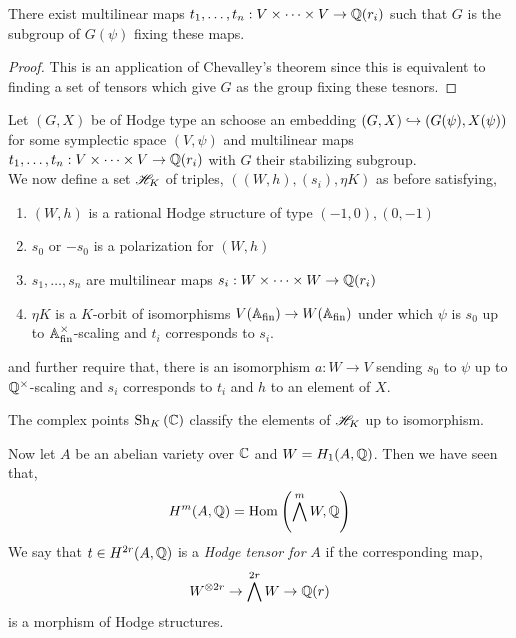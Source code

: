 \documentclass[12pt]{article}
\begin{document}
\begin{prop}
There exist multilinear maps $t_1, \dots, t_n : V \times \cdots \times V \to \mathbb{Q}(r_i)$ such that $G$ is the subgroup of $G(\psi)$ fixing these maps.
\end{prop}

\begin{proof}
This is an application of Chevalley's theorem since this is equivalent to finding a set of tensors which give $G$ as the group fixing these tesnors. 
\end{proof}


\begin{rmk}
Let $(G, X)$ be of Hodge type an schoose an embedding $(G, X) \hookrightarrow (G(\psi), X(\psi))$ for some symplectic space $(V, \psi)$ and  multilinear maps $t_1, \dots, t_n : V \times \cdots \times V \to \mathbb{Q}(r_i)$ with $G$ their stabilizing subgroup. 
\bigskip\\
We now define a set $\mathscr{H}_K$ of triples, $((W, h), (s_i), \eta K)$ as before satisfying,
\begin{enumerate}
\item $(W, h)$ is a rational Hodge structure of type $(-1,0), (0, -1)$
\item $s_0$ or $-s_0$ is a polarization for $(W, h)$
\item $s_1, \dots, s_n$ are multilinear maps $s_i : W \times \cdots \times W \to \mathbb{Q}(r_i)$
\item $\eta K$ is a $K$-orbit of isomorphisms $V(\mathbb{A}_{\mathrm{fin}}) \to W(\mathbb{A}_{\mathrm{fin}})$ under which $\psi$ is $s_0$ up to $\mathbb{A}_{\mathrm{fin}}^\times$-scaling and $t_i$ corresponds to $s_i$.
\end{enumerate}
and further require that, there is an isomorphism $a : W \to V$ sending $s_0$ to $\psi$ up to $\mathbb{Q}^\times$-scaling and $s_i$ corresponds to $t_i$ and $h$ to an element of $X$. 
\end{rmk}

\begin{prop}
The complex points $\mathrm{Sh}_{K} \left( \mathbb{\mathbb{C}} \right)$ classify the elements of $\mathscr{H}_K$ up to isomorphism. 
\end{prop}

\begin{defn}
Now let $A$ be an abelian variety over $\mathbb{C}$ and $W = H_1(A, \mathbb{Q})$. Then we have seen that,
\[ H^m(A, \mathbb{Q}) = \mathrm{Hom}_{} \left( \bigwedge^m W, \mathbb{Q} \right) \]
We say that $t \in H^{2r}(A, \mathbb{Q})$ is a \textit{Hodge tensor for} $A$ if the corresponding map,
\[ W^{\otimes 2r} \to \bigwedge^{2r} W \to \mathbb{Q}(r) \]
is a morphism of Hodge structures.
\end{defn}
\end{document}
